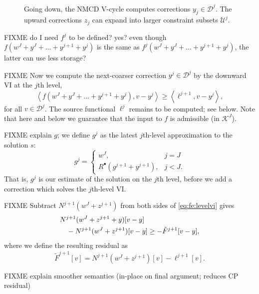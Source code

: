 \documentclass[letterpaper,final,12pt,reqno]{amsart}
\theoremstyle{cstyle}
\theoremstyle{cstyle*}
\theoremstyle{dstyle}
\numberwithin{equation}{section}
\numberwithin{figure}{section}
\numberwithin{table}{section}
\numberwithin{theorem}{section}
\newcommand{\ip}[2]{\left<#1,#2\right>}
\newcommand{\iR}{R^{\bullet}}
\begin{document}
\begin{figure}[h]
\begin{center}

\end{center}
\caption{Going down, the NMCD V-cycle computes corrections $y_j \in \mathcal{D}^j$.  The upward corrections $z_j$ can expand into larger constraint subsets $\mathcal{U}^j$.}
\label{fig:nmcdvcycle}
\end{figure}

FIXME do I need $f^j$ to be defined?  yes?  even though $f(w^J+y^J + \dots + y^{j+1} +y^j)$ is the same as $f^j(w^J+y^J + \dots + y^{j+1} +y^j)$, the latter can use less storage?

FIXME Now we compute the next-coarser correction $y^j \in \mathcal{D}^j$ by the downward VI at the $j$th level,
\begin{equation}
\ip{f(w^J+y^J + \dots + y^{j+1} +y^j)}{v-y^j} \ge \ip{\ell^{j+1}}{v-y^j}, \label{eq:fe:levelvi}
\end{equation}
for all $v \in \mathcal{D}^j$.  The source functional $\ell^j$ remains to be computed; see below.  Note that here and below we guarantee that the input to $f$ is admissible (in $\mathcal{K}^J$).

FIXME explain $g$; we define $g^j$ as the latest $j$th-level approximation to the solution $s$:
\begin{equation}
g^j = \begin{cases} w^J, & j=J \\
                    \iR(g^{j+1} + y^{j+1}), & j < J.
      \end{cases}  \label{eq:fe:defineg}
\end{equation}
That is, $g^j$ is our estimate of the solution on the $j$th level, before we add a correction which solves the $j$th-level VI.

FIXME Subtract $N^{j+1}(w^J+z^{j+1})$ from both sides of \eqref{eq:fe:levelvi} gives
\begin{align}
&N^{j+1}(w^J+z^{j+1}+y)[v-y] \label{eq:siaVIFEprecoarsetwo} \\
&\quad - N^{j+1}(w^J+z^{j+1})[v-y] \ge - \tilde F^{j+1}[v-y], \notag
\end{align}
where we define the resulting residual as
\begin{equation}
\tilde F^{j+1}[v] = N^{j+1}(w^J+z^{j+1})[v] - \ell^{j+1}[v].
\end{equation}


FIXME explain smoother semantics (in-place on final argument; reduces CP residual)
\end{document}
